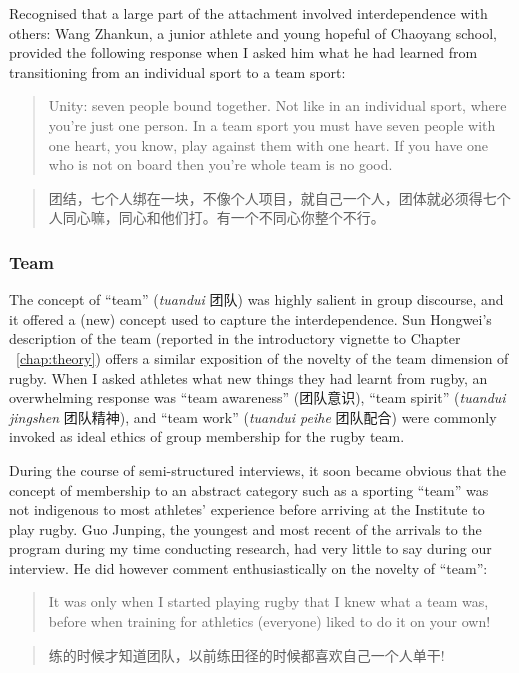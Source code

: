\begin{CJK}{UTF8}{gbsn}
Recognised that a large part of the attachment involved interdependence with others:
   Wang Zhankun, a junior athlete and young hopeful of Chaoyang school, provided the following response when I asked him what he had learned from transitioning from an individual sport to a team sport:
         \begin{quote}
           Unity: seven people bound together.  Not like in an individual sport, where you’re just one person. In a team sport you must have seven people with one heart, you know, play against them with one heart.  If you have one who is not on board then you’re whole team is no good.
         \end{quote}
         \begin{quote}
           团结，七个人绑在一块，不像个人项目，就自己一个人，团体就必须得七个人同心嘛，同心和他们打。有一个不同心你整个不行。
         \end{quote}

\subsubsection{Team}
The concept of ``team'' (\textit{tuandui} 团队) was highly salient in group discourse, and it offered a (new) concept used to capture the interdependence.  Sun Hongwei's description of the team (reported in the introductory vignette to Chapter ~\ref{chap:theory}) offers a similar exposition of the novelty of the team dimension of rugby. When I asked athletes what new things they had learnt from rugby, an overwhelming response was ``team awareness'' (团队意识), ``team spirit'' (\textit{tuandui jingshen} 团队精神), and ``team work'' (\textit{tuandui peihe} 团队配合) were commonly invoked as ideal ethics of group membership for the rugby team.

During the course of semi-structured interviews, it soon became obvious that the concept of membership to an abstract category such as a sporting ``team'' was not indigenous to most athletes' experience before arriving at the Institute to play rugby.  Guo Junping, the youngest and most recent of the arrivals to the program during my time conducting research, had very little to say during our interview. He did however comment enthusiastically on the novelty of ``team'':

\begin{quote}
  It was only when I started playing rugby that I knew what a team was, before when training for athletics (everyone) liked to do it on your own!
\end{quote}
\begin{quote}
  练的时候才知道团队，以前练田径的时候都喜欢自己一个人单干!
\end{quote}


\end{CJK}
